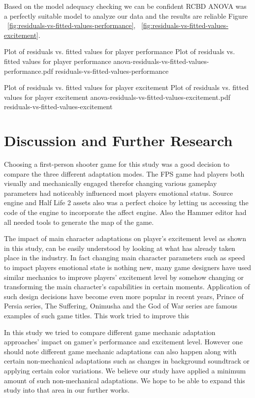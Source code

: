 \documentclass[conference]{IEEEtran}
\begin{document}
Based on the model adequacy checking we can be confident RCBD ANOVA was a perfectly suitable model to analyze our data and the results are reliable Figure ~\ref{fig:residuals-vs-fitted-values-performance}, ~\ref{fig:residuals-vs-fitted-values-excitement}.

\img
{Plot of residuals vs. fitted values for player performance}
{Plot of residuals vs. fitted values for player performance}
{anova-residuals-vs-fitted-values-performance.pdf}
{residuals-vs-fitted-values-performance}

\img
{Plot of residuals vs. fitted values for player excitement}
{Plot of residuals vs. fitted values for player excitement}
{anova-residuals-vs-fitted-values-excitement.pdf}
{residuals-vs-fitted-values-excitement}



\section{Discussion and Further Research}
\label{sec:discus}

Choosing a first-person shooter game for this study was a good decision to compare the three different adaptation modes. The FPS game had players both visually and mechanically engaged therefor changing various gameplay parameters had noticeably influenced most players emotional status. Source engine and Half Life 2 assets also was a perfect choice by letting us accessing the code of the engine to incorporate the affect engine. Also the Hammer editor had all needed tools to generate the map of the game.

The impact of main character adaptations on player's excitement level as shown in this study, can be easily understood by looking at what has already taken place in the industry. In fact changing main character parameters such as speed to impact players emotional state is nothing new, many game designers have used similar mechanics to improve players' excitement level by somehow changing or transforming the main character's capabilities in certain moments. Application of such design decisions have become even more popular in recent years, Prince of Persia series, The Suffering, Onimusha and the God of War series are famous examples of such game titles. This work tried to improve this 

In this study we tried to compare different game mechanic adaptation approaches' impact on gamer's performance and excitement level. However one should note different game mechanic adaptations can also happen along with certain non-mechanical adaptations such as changes in background soundtrack or applying certain color variations. We believe our study have applied a minimum amount of such non-mechanical adaptations. We hope to be able to expand this study into that area in our further works.
\end{document}
